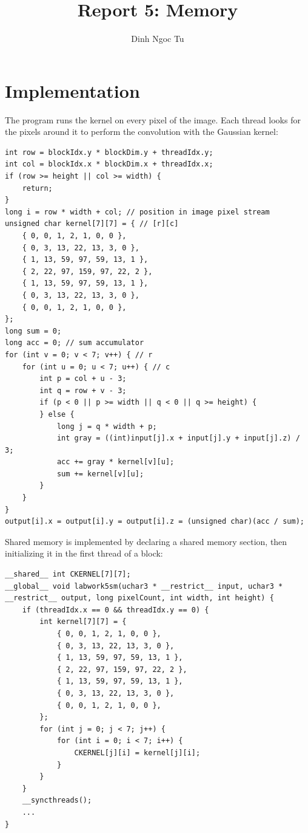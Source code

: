 \documentclass[12pt]{article}
\title{Report 5: Memory}
\author{Dinh Ngoc Tu}
\begin{document}
\maketitle


\section{Implementation}

The program runs the kernel on every pixel of the image. Each thread looks for the pixels around it to perform the convolution with the Gaussian kernel:

\begin{lstlisting}[breaklines]
int row = blockIdx.y * blockDim.y + threadIdx.y;
int col = blockIdx.x * blockDim.x + threadIdx.x;
if (row >= height || col >= width) {
    return;
}
long i = row * width + col; // position in image pixel stream
unsigned char kernel[7][7] = { // [r][c]
    { 0, 0, 1, 2, 1, 0, 0 },
    { 0, 3, 13, 22, 13, 3, 0 },
    { 1, 13, 59, 97, 59, 13, 1 },
    { 2, 22, 97, 159, 97, 22, 2 },
    { 1, 13, 59, 97, 59, 13, 1 },
    { 0, 3, 13, 22, 13, 3, 0 },
    { 0, 0, 1, 2, 1, 0, 0 },
};
long sum = 0;
long acc = 0; // sum accumulator
for (int v = 0; v < 7; v++) { // r
    for (int u = 0; u < 7; u++) { // c
        int p = col + u - 3;
        int q = row + v - 3;
        if (p < 0 || p >= width || q < 0 || q >= height) {
        } else {
            long j = q * width + p;
            int gray = ((int)input[j].x + input[j].y + input[j].z) / 3;
            acc += gray * kernel[v][u];
            sum += kernel[v][u];
        }
    }
}
output[i].x = output[i].y = output[i].z = (unsigned char)(acc / sum);
\end{lstlisting}

Shared memory is implemented by declaring a shared memory section, then initializing it in the first thread of a block:

\begin{lstlisting}[breaklines]
__shared__ int CKERNEL[7][7];
__global__ void labwork5sm(uchar3 * __restrict__ input, uchar3 * __restrict__ output, long pixelCount, int width, int height) {
    if (threadIdx.x == 0 && threadIdx.y == 0) {
        int kernel[7][7] = {
            { 0, 0, 1, 2, 1, 0, 0 },
            { 0, 3, 13, 22, 13, 3, 0 },
            { 1, 13, 59, 97, 59, 13, 1 },
            { 2, 22, 97, 159, 97, 22, 2 },
            { 1, 13, 59, 97, 59, 13, 1 },
            { 0, 3, 13, 22, 13, 3, 0 },
            { 0, 0, 1, 2, 1, 0, 0 },
        };
        for (int j = 0; j < 7; j++) {
            for (int i = 0; i < 7; i++) {
                CKERNEL[j][i] = kernel[j][i];
            }
        }
    }
    __syncthreads();
    ...
}
\end{lstlisting}
\end{document}

